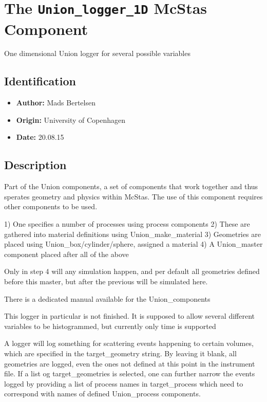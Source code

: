\section{The \texttt{Union\_logger\_1D} McStas Component}
One dimensional Union logger for several possible variables

\subsection*{Identification}
\begin{itemize}
  \item \textbf{Author:} Mads Bertelsen
  \item \textbf{Origin:} University of Copenhagen
  \item \textbf{Date:} 20.08.15
\end{itemize}

\subsection*{Description}
Part of the Union components, a set of components that work together and thus sperates geometry and physics within McStas. The use of this component requires other components to be used.

1) One specifies a number of processes using process components 2) These are gathered into material definitions using Union\_make\_material 3) Geometries are placed using Union\_box/cylinder/sphere, assigned a material 4) A Union\_master component placed after all of the above

Only in step 4 will any simulation happen, and per default all geometries defined before this master, but after the previous will be simulated here.

There is a dedicated manual available for the Union\_components

This logger in particular is not finished. It is supposed to allow several different variables to be histogrammed, but currently only time is supported

A logger will log something for scattering events happening to certain volumes, which are specified in the target\_geometry string. By leaving it blank, all geometries are logged, even the ones not defined at this point in the instrument file. If a list og target\_geometries is selected, one can further narrow the events logged by providing a list of process names in target\_process which need to correspond with names of defined Union\_process components.

